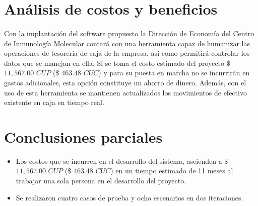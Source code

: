 \section{Análisis de costos y beneficios}
\paragraph{}Con la implantación del software propuesto la Dirección de Economía del Centro de Inmunología Molecular contará con una herramienta capaz de humanizar las operaciones de tesorería de caja de la empresa, así como permitirá controlar los datos que se manejan en ella. Si se toma el costo estimado del proyecto $\$$       $11,567.00$ $CUP$ ($\$$ $463.48$ $CUC$) y para su puesta en marcha no se incurrirán en gastos adicionales, esta opción constituye un ahorro de dinero. Además, con el uso de esta herramienta se mantienen actualizados los movimientos de efectivo existente en caja en tiempo real.

\section{Conclusiones parciales}
\begin{itemize}
	\item Los costos que se incurren en el desarrollo del sistema, ascienden a $\$$  $11,567.00$ $CUP$ ($\$$ $463.48$ $CUC$) en un tiempo estimado de 11 meses al trabajar una sola persona en el desarrollo del proyecto.
	\item Se realizaron cuatro casos de prueba y ocho escenarios en dos iteraciones.
\end{itemize}